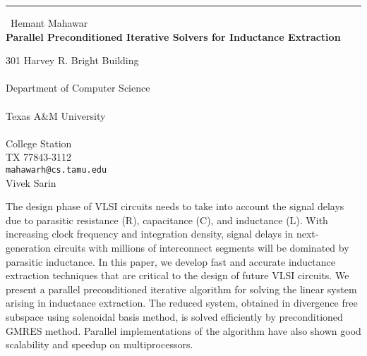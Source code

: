 \documentclass{report}
\begin{document}
\begin{center}
\rule{6in}{1pt} \
{\large Hemant Mahawar \\
{\bf Parallel Preconditioned Iterative Solvers for Inductance Extraction}}

301 Harvey R. Bright Building \\ \\ Department of Computer Science \\ \\ Texas A\&M University \\ \\ College Station \\ TX 77843-3112
\\
{\tt mahawarh@cs.tamu.edu}\\
Vivek Sarin\end{center}

The design phase of VLSI circuits needs to take into account the signal
delays due to parasitic resistance (R), capacitance (C), and inductance
(L). With increasing clock frequency and integration density, signal
delays in next-generation circuits with millions of interconnect segments
will be dominated by parasitic inductance. In this paper, we develop fast
and accurate inductance extraction techniques that are critical to the
design of future VLSI circuits. We present a parallel preconditioned
iterative algorithm for solving the linear system arising in inductance
extraction. The reduced system, obtained in divergence free subspace
using solenoidal basis method, is solved efficiently by preconditioned
GMRES method. Parallel implementations of the algorithm have also shown
good scalability and speedup on multiprocessors.
\end{document}
